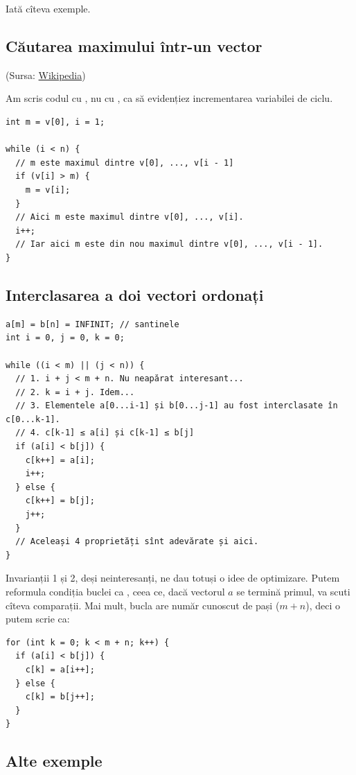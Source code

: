 \documentclass[../main.tex]{subfiles}
\begin{document}
Iată cîteva exemple.


\subsection{Căutarea maximului într-un vector}

(Sursa: \href{https://en.wikipedia.org/wiki/Loop_invariant}{Wikipedia})

Am scris codul cu , nu cu , ca să evidențiez incrementarea variabilei de ciclu.

\begin{verbatim}
int m = v[0], i = 1;

while (i < n) {
  // m este maximul dintre v[0], ..., v[i - 1]
  if (v[i] > m) {
    m = v[i];
  }
  // Aici m este maximul dintre v[0], ..., v[i].
  i++;
  // Iar aici m este din nou maximul dintre v[0], ..., v[i - 1].
}
\end{verbatim}


\subsection{Interclasarea a doi vectori ordonați}

\begin{verbatim}
a[m] = b[n] = INFINIT; // santinele
int i = 0, j = 0, k = 0;

while ((i < m) || (j < n)) {
  // 1. i + j < m + n. Nu neapărat interesant...
  // 2. k = i + j. Idem...
  // 3. Elementele a[0...i-1] și b[0...j-1] au fost interclasate în c[0...k-1].
  // 4. c[k-1] ≤ a[i] și c[k-1] ≤ b[j]
  if (a[i] < b[j]) {
    c[k++] = a[i];
    i++;
  } else {
    c[k++] = b[j];
    j++;
  }
  // Aceleași 4 proprietăți sînt adevărate și aici.
}
\end{verbatim}

Invarianții 1 și 2, deși neinteresanți, ne dau totuși o idee de optimizare. Putem reformula condiția buclei ca , ceea ce, dacă vectorul $a$ se termină primul, va scuti cîteva comparații. Mai mult, bucla are număr cunoscut de pași ($m + n$), deci o putem scrie ca:

\begin{verbatim}
for (int k = 0; k < m + n; k++) {
  if (a[i] < b[j]) {
    c[k] = a[i++];
  } else {
    c[k] = b[j++];
  }
}
\end{verbatim}


\subsection{Alte exemple}
\end{document}
